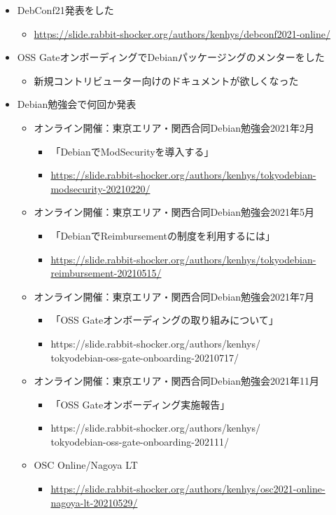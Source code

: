 \documentclass[mingoth,a4paper]{jsarticle}
\begin{document}

\begin{itemize}
  \item DebConf21発表をした
  \begin{itemize}
    \item \url{https://slide.rabbit-shocker.org/authors/kenhys/debconf2021-online/}
  \end{itemize}
  \item OSS GateオンボーディングでDebianパッケージングのメンターをした
    \begin{itemize}
    \item 新規コントリビューター向けのドキュメントが欲しくなった
    \end{itemize}
  \item Debian勉強会で何回か発表
    \begin{itemize}
    \item オンライン開催：東京エリア・関西合同Debian勉強会2021年2月
      \begin{itemize}
      \item 「DebianでModSecurityを導入する」
      \item \url{https://slide.rabbit-shocker.org/authors/kenhys/tokyodebian-modsecurity-20210220/}
      \end{itemize}
    \item オンライン開催：東京エリア・関西合同Debian勉強会2021年5月
      \begin{itemize}
      \item 「DebianでReimbursementの制度を利用するには」
      \item \url{https://slide.rabbit-shocker.org/authors/kenhys/tokyodebian-reimbursement-20210515/}
      \end{itemize}
    \item オンライン開催：東京エリア・関西合同Debian勉強会2021年7月
      \begin{itemize}
      \item 「OSS Gateオンボーディングの取り組みについて」
      \item https://slide.rabbit-shocker.org/authors/kenhys/ \\ tokyodebian-oss-gate-onboarding-20210717/
      \end{itemize}
    \item オンライン開催：東京エリア・関西合同Debian勉強会2021年11月
      \begin{itemize}
      \item 「OSS Gateオンボーディング実施報告」
      \item https://slide.rabbit-shocker.org/authors/kenhys/ \\ tokyodebian-oss-gate-onboarding-202111/
      \end{itemize}
    \item OSC Online/Nagoya LT
      \begin{itemize}
      \item \url{https://slide.rabbit-shocker.org/authors/kenhys/osc2021-online-nagoya-lt-20210529/}
      \end{itemize}
    \end{itemize}
\end{itemize}
\end{document}
